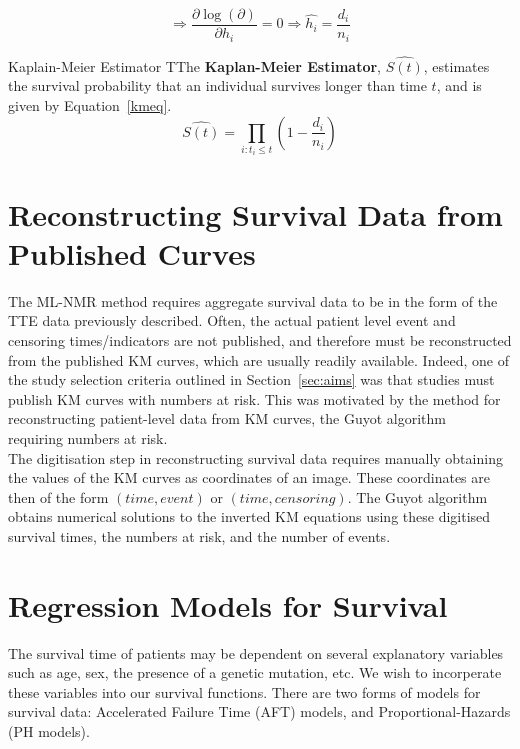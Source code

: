 \begin{equation}
    \Rightarrow \frac{\partial \log (\partial )}{\partial h_i} = 0 \Rightarrow \hat{h_i} = \frac{d_i}{n_i}
    \label{kmHaz}
\end{equation}

\begin{definition}[label={kmEst}]{Kaplain-Meier Estimator}
    TThe \textbf{Kaplan-Meier Estimator}, $\hat{S(t)}$, estimates the survival probability that an individual survives longer than time $t$, and is given by Equation~\ref{kmeq}. 
\begin{equation}
    \hat{S(t)} = \prod_{i:t_i \leq t}\left(1 - \frac{d_i}{n_i}\right)
    \label{kmeq}
\end{equation}
\end{definition}

\section{Reconstructing Survival Data from Published Curves}
The ML-NMR method requires aggregate survival data to be in the form of the TTE data previously described. Often, the actual patient level event and censoring times/indicators are not published, and therefore must be reconstructed from the published KM curves, which are usually readily available. Indeed, one of the study selection criteria outlined in Section~\ref{sec:aims} was that studies must publish KM curves with numbers at risk. This was motivated by the method for reconstructing patient-level data from KM curves, the Guyot algorithm~\cite{guyotipd} requiring numbers at risk. \\

The digitisation step in reconstructing survival data requires manually obtaining the values of the KM curves as coordinates of an image. These coordinates are then of the form $(time, event)$ or $(time, censoring)$. The Guyot algorithm obtains numerical solutions to the inverted KM equations using these digitised survival times, the numbers at risk, and the number of events.

\section{Regression Models for Survival}\label{survReg}
The survival time of patients may be dependent on several explanatory variables such as age, sex, the presence of a genetic mutation, etc. We wish to incorperate these variables into our survival functions. There are two forms of models for survival data: Accelerated Failure Time (AFT) models, and Proportional-Hazards (PH models).

